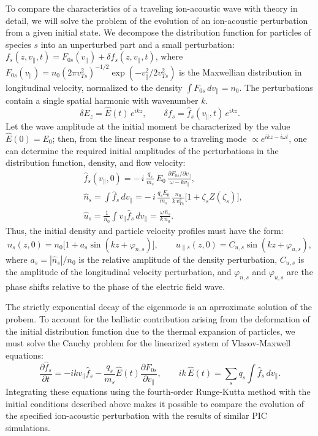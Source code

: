 \documentclass[final,3p]{elsarticle}
\begin{document}
To compare the characteristics of a traveling ion-acoustic wave with theory in detail, we will solve the problem of the evolution of an ion-acoustic perturbation from a given initial state. We decompose the distribution function for particles of species $s$ into an unperturbed part and a small perturbation: $f_s(z,v_{\|},t)=F_{0s}(v_{\|})+\delta f_s(z,v_{\|},t)$, where $F_{0s}(v_{\|})=n_0(2\pi v_{Ts}^2)^{-1/2}\exp(-v_{\|}^2/2v_{Ts}^2)$ is the Maxwellian distribution in longitudinal velocity, normalized to the density $\int F_{0s}\,dv_{\|}=n_0$. The perturbations contain a single spatial harmonic with wavenumber $k$.  
\begin{equation}
	\delta E_z=\hat E(t)\,e^{ikz}, \qquad \delta f_s=\hat f_s(v_{\|},t)\,e^{ikz}.
\end{equation}
Let the wave amplitude at the initial moment be characterized by the value $\hat E(0)=E_0$; then, from the linear response to a traveling mode $\propto e^{ikz-i\omega t}$, one can determine the required initial amplitudes of the perturbations in the distribution function, density, and flow velocity:
\begin{align}
	&\hat f_s(v_{\|},0)=-\,i\,\frac{q_s}{m_s}\,E_0\,\frac{\partial F_{0s}/\partial v_{\|}}{\omega-k v_{\|}}, \label{fd} \\
	&\hat n_s=\int\hat f_s\,dv_{\|}=-\,i\,\frac{q_sE_0}{m_s}\,\frac{n_0}{k\,v_{Ts}^2} \bigl[1+\zeta_sZ(\zeta_s)\bigr], \\ 
	&\hat u_s=\frac{1}{n_0}\int v_{\|}\hat f_s\,dv_{\|}=\frac{\omega\,\hat n_s}{k\,n_0}. 
\end{align}
Thus, the initial density and particle velocity profiles must have the form:
\begin{equation}\label{ia_init}
    n_s(z,0)=n_0\bigl[1+a_s\sin(kz+\varphi_{n,s})\bigr],
    \qquad
    u_{\|s}(z,0)=C_{u,s}\sin(kz+\varphi_{u,s}),
\end{equation}
where $a_s=|\hat n_s|/n_0$ is the relative amplitude of the density perturbation, $C_{u,s}$ is the amplitude of the longitudinal velocity perturbation, and $\varphi_{n,s}$ and $\varphi_{u,s}$ are the phase shifts relative to the phase of the electric field wave.

The strictly exponential decay of the eigenmode is an aprroximate solution of the probem. To account for the ballistic contribution arising from the deformation of the initial distribution function due to the thermal expansion of particles, we must solve the Cauchy problem for the linearized system of Vlasov-Maxwell equations:
\begin{equation}\label{ia_ivp}
    \frac{\partial \hat f_s}{\partial t}=-i k v_{\|} \hat f_s 
    -\frac{q_s}{m_s}\hat E(t)\frac{\partial F_{0s}}{\partial v_{\|}},
    \qquad
    ik\,\hat E(t)=\sum_s q_s\!\int \hat f_s\,dv_{\|}.
\end{equation}
Integrating these equations using the fourth-order Runge-Kutta method with the initial conditions described above makes it possible to compare the evolution of the specified ion-acoustic perturbation with the results of similar PIC simulations. 
\end{document}
